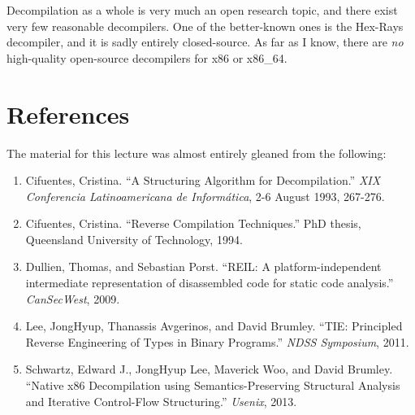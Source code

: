 \documentclass{article}
\begin{document}
Decompilation as a whole is very much an open research topic, and there exist very few reasonable
decompilers. One of the better-known ones is the Hex-Rays decompiler, and it is sadly entirely
closed-source. As far as I know, there are {\em no} high-quality open-source decompilers
for x86 or x86\_64.

\section{References}
The material for this lecture was almost entirely gleaned from the following:
\begin{enumerate}
\item Cifuentes, Cristina. ``A Structuring Algorithm for Decompilation.'' {\em XIX 
Conferencia Latinoamericana de Inform\'atica}, 2-6 August 1993, 267-276.
\item Cifuentes, Cristina. ``Reverse Compilation Techniques.'' PhD thesis, Queensland University of Technology, 1994.
\item Dullien, Thomas, and Sebastian Porst. ``REIL: A platform-independent intermediate
representation of disassembled code for static code analysis.'' {\em CanSecWest},  2009.
\item Lee, JongHyup, Thanassis Avgerinos, and David Brumley. ``TIE: Principled Reverse Engineering of Types in Binary Programs.'' {\em NDSS Symposium}, 2011.
\item Schwartz, Edward J., JongHyup Lee, Maverick Woo, and David Brumley. ``Native x86 Decompilation using Semantics-Preserving Structural Analysis and Iterative Control-Flow Structuring.'' {\em Usenix}, 2013.
\end{enumerate}
\end{document}

